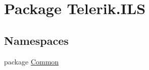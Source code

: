 \hypertarget{namespace_telerik_1_1_i_l_s}{\section{Package Telerik.\-I\-L\-S}
\label{namespace_telerik_1_1_i_l_s}
}
\subsection*{Namespaces}
\begin{DoxyCompactItemize}
\item 
package \hyperlink{namespace_telerik_1_1_i_l_s_1_1_common}{Common}
\end{DoxyCompactItemize}

